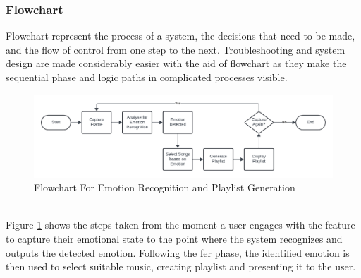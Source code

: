 \subsubsection{Flowchart}
Flowchart represent the process of a system, the decisions that need to be made, and the flow of control from one step to the next.
Troubleshooting and system design are made considerably easier with the aid of flowchart as they make the sequential phase and logic paths in complicated processes visible. \citep{lucidchart_2019_what}
\begin{figure}[!ht]
    \centering
    \includegraphics[width=14cm]{Images/flowchart.png}
    \caption{Flowchart For Emotion Recognition and Playlist Generation}
    \label{fig:flowchart-fer-pg}
\end{figure}
\\
\indent Figure \ref{fig:flowchart-fer-pg} shows the steps taken from the moment a user engages with the feature to capture their emotional state to the point where the system recognizes and outputs the detected emotion.
Following the \gls{fer} phase, the identified emotion is then used to select suitable music, creating playlist and presenting it to the user. 
\\
